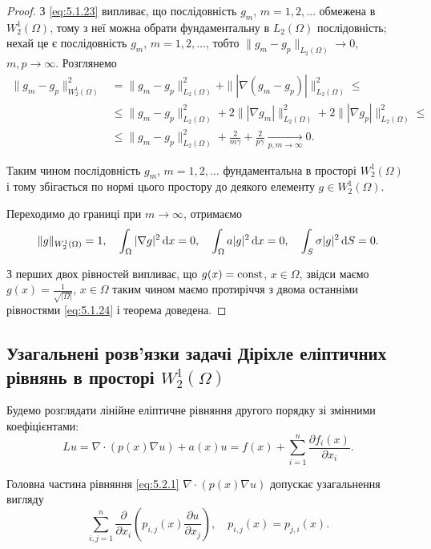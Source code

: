 \begin{proof}
    З \eqref{eq:5.1.23} випливає, що послідовність $g_m$, $m = 1, 2, \ldots$ обмежена в $W_2^1(\Omega)$, тому з неї можна обрати фундаментальну в $L_2(\Omega)$ послідовність; нехай це є послідовність $g_m$, $m = 1, 2, \ldots$, тобто $\|g_m - g_p\|_{L_2(\Omega)} \to 0$, $m, p \to \infty$. Розглянемо
    \begin{align*}
        \|g_m - g_p\|_{W_2^1(\Omega)}^2
        &= \|g_m - g_p\|_{L_2(\Omega)}^2 + \| |\nabla (g_m - g_p)| \|_{L_2(\Omega)}^2 \le \\
        &\le \|g_m - g_p\|_{L_2(\Omega)}^2 + 2 \| |\nabla g_m| \|_{L_2(\Omega)}^2 + 2 \| |\nabla g_p| \|_{L_2(\Omega)}^2 \le \\
        &\le \|g_m - g_p\|_{L_2(\Omega)}^2 + \frac{2}{m \gamma} + \frac{2}{p \gamma} \xrightarrow[p, m \to \infty]{} 0.
    \end{align*}

    Таким чином послідовність $g_m$, $m = 1, 2, \ldots$ фундаментальна в просторі $W_2^1(\Omega)$ і тому збігається по нормі цього простору до деякого елементу $g \in W_2^1(\Omega)$. \medskip 

    Переходимо до границі при $m \to \infty$, отримаємо
    \begin{equation}
        \label{eq:5.1.24}
        \|g\|_{W_2^1(\Omega)} = 1, \quad \int_\Omega |\nabla g|^2 \mathop{}\!\mathrm{d} x = 0, \quad \int_\Omega a |g|^2 \mathop{}\!\mathrm{d} x = 0, \quad \int_S \sigma |g|^2 \mathop{}\!\mathrm{d} S = 0.
    \end{equation}

    З перших двох рівностей випливає, що $g(x) = \operatorname{const}$, $x \in \Omega$, звідси маємо $g(x) = \frac{1}{\sqrt{|\Omega|}}$, $x \in \Omega$ таким чином маємо протиріччя з двома останніми рівностями \eqref{eq:5.1.24} і теорема доведена.
\end{proof}

\subsection{Узагальнені розв'язки задачі Діріхле еліптичних рівнянь в просторі \texorpdfstring{$W_2^1(\Omega)$}{W21Omega}}

Будемо розглядати лінійне еліптичне рівняння другого порядку зі змінними коефіцієнтами:
\begin{equation}
    \label{eq:5.2.1}
    L u = \nabla \cdot (p(x) \nabla u) + a(x) u = f(x) + \sum_{i = 1}^n \frac{\partial f_i(x)}{\partial x_i}.
\end{equation}

Головна частина рівняння \eqref{eq:5.2.1} $\nabla \cdot (p(x) \nabla u)$ допускає узагальнення вигляду
\begin{equation}
    \label{eq:5.2.2}
    \sum_{i, j = 1}^n \frac{\partial}{\partial x_i} \left( p_{i,j}(x) \frac{\partial u}{\partial x_j} \right), \quad p_{i,j}(x) = p_{j,i}(x).
\end{equation}

